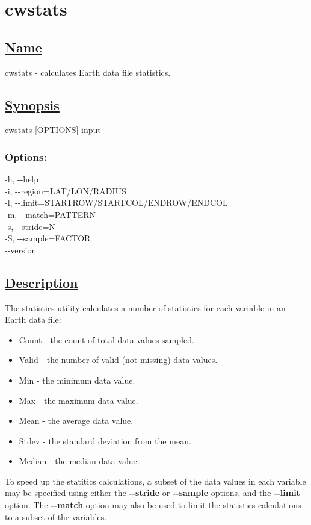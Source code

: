 \newpage
\section{cwstats} \hypertarget{cwstats}{}
\subsection*{\underline{Name}}


   cwstats - calculates Earth data file statistics.  
\subsection*{\underline{Synopsis}}


  cwstats [OPTIONS] input 
\subsubsection*{Options:}


  -h, -{-}help \\ 
 -i, -{-}region=LAT/LON/RADIUS \\ 
 -l, -{-}limit=STARTROW/STARTCOL/ENDROW/ENDCOL \\ 
 -m, -{-}match=PATTERN \\ 
 -s, -{-}stride=N \\ 
 -S, -{-}sample=FACTOR \\ 
 -{-}version \\ 

\subsection*{\underline{Description}}


  The statistics utility calculates a number of statistics for each variable in an Earth data file: \begin{itemize}
\item  Count - the count of total data values sampled. 
\item  Valid - the number of valid (not missing) data values. 
\item  Min - the minimum data value. 
\item  Max - the maximum data value. 
\item  Mean - the average data value. 
\item  Stdev - the standard deviation from the mean. 
\item  Median - the median data value. 

\end{itemize}
 To speed up the statitics calculations, a subset of the data values in each variable may be specified using either the \textbf{-{-}stride}
 or \textbf{-{-}sample}
 options, and the \textbf{-{-}limit}
 option. The \textbf{-{-}match}
 option may also be used to limit the statistics calculations to a subset of the variables. 
